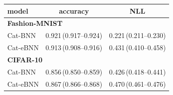 \begin{tabular}{lcc}
\toprule
model & accuracy & NLL \\
\midrule
\multicolumn{3}{l}{\textbf{Fashion-MNIST}} \\
Cat-BNN & 0.921\,(0.917--0.924) & 0.221\,(0.211--0.230) \\
Cat-eBNN & 0.913\,(0.908--0.916) & 0.431\,(0.410--0.458) \\
\midrule
\multicolumn{3}{l}{\textbf{CIFAR-10}} \\
Cat-BNN & 0.856\,(0.850--0.859) & 0.426\,(0.418--0.441) \\
Cat-eBNN & 0.867\,(0.866--0.868) & 0.470\,(0.461--0.476) \\
\bottomrule
\end{tabular}
